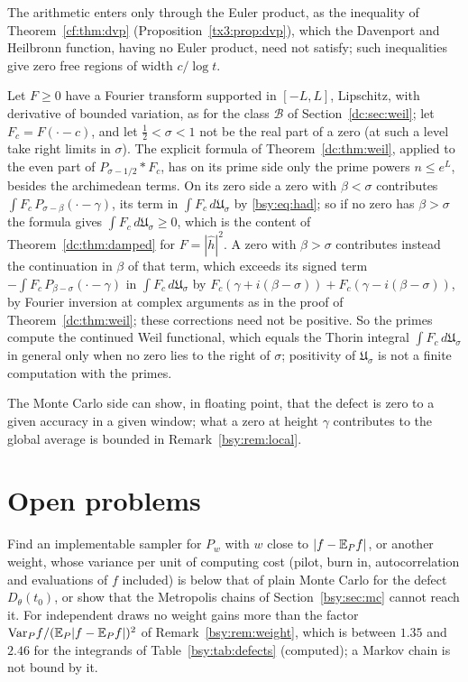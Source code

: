 The arithmetic enters only through the Euler product, as the inequality of Theorem~\ref{cf:thm:dvp} (Proposition~\ref{tx3:prop:dvp}), which the Davenport and Heilbronn function, having no Euler product, need not satisfy; such inequalities give zero free regions of width $c/\log t$.

\begin{remark}\label{bsy:rem:weil}
Let $F\ge0$ have a Fourier transform supported in $[-L,L]$, Lipschitz, with derivative of bounded variation, as for the class $\mathcal B$ of Section~\ref{dc:sec:weil}; let $F_c=F(\cdot-c)$, and let $\frac12<\sigma<1$ not be the real part of a zero (at such a level take right limits in $\sigma$). The explicit formula of Theorem~\ref{dc:thm:weil}, applied to the even part of $P_{\sigma-1/2}*F_c$, has on its prime side only the prime powers $n\le e^L$, besides the archimedean terms. On its zero side a zero with $\beta<\sigma$ contributes $\int F_c\,P_{\sigma-\beta}(\cdot-\gamma)$, its term in $\int F_c\,d\mathfrak U_\sigma$ by \eqref{bsy:eq:had}; so if no zero has $\beta>\sigma$ the formula gives $\int F_c\,d\mathfrak U_\sigma\ge0$, which is the content of Theorem~\ref{dc:thm:damped} for $F=|\hat h|^2$. A zero with $\beta>\sigma$ contributes instead the continuation in $\beta$ of that term, which exceeds its signed term $-\int F_c\,P_{\beta-\sigma}(\cdot-\gamma)$ in $\int F_c\,d\mathfrak U_\sigma$ by $F_c(\gamma+i(\beta-\sigma))+F_c(\gamma-i(\beta-\sigma))$, by Fourier inversion at complex arguments as in the proof of Theorem~\ref{dc:thm:weil}; these corrections need not be positive. So the primes compute the continued Weil functional, which equals the Thorin integral $\int F_c\,d\mathfrak U_\sigma$ in general only when no zero lies to the right of $\sigma$; positivity of $\mathfrak U_\sigma$ is not a finite computation with the primes.
\end{remark}

The Monte Carlo side can show, in floating point, that the defect is zero to a given accuracy in a given window; what a zero at height $\gamma$ contributes to the global average is bounded in Remark~\ref{bsy:rem:local}.

\section{Open problems}\label{bsy:sec:open}

\begin{problem}\label{bsy:op:weight}
Find an implementable sampler for $P_w$ with $w$ close to $|f-\mathbb{E}_Pf|$, or another weight, whose variance per unit of computing cost (pilot, burn in, autocorrelation and evaluations of $f$ included) is below that of plain Monte Carlo for the defect $D_\theta(t_0)$, or show that the Metropolis chains of Section~\ref{bsy:sec:mc} cannot reach it. For independent draws no weight gains more than the factor $\mathrm{Var}_Pf/(\mathbb{E}_P|f-\mathbb{E}_Pf|)^2$ of Remark~\ref{bsy:rem:weight}, which is between $1.35$ and $2.46$ for the integrands of Table~\ref{bsy:tab:defects} (computed); a Markov chain is not bound by it.
\end{problem}

